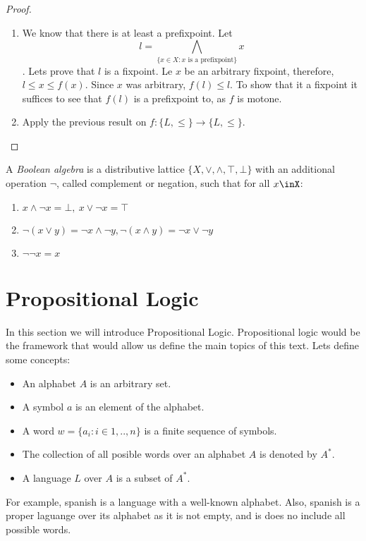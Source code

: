 \begin{definition}
\begin{proof}
  \begin{enumerate}
  \item We know that there is at least a prefixpoint. Let
    $$l = \bigwedge_{\{x\in X: x\text{ is a prefixpoint}\}} x $$. 
    Lets prove that $l$ is a fixpoint. Le $x$ be an arbitrary fixpoint, therefore, $l \le x \le f(x)$. Since $x$ was arbitrary, $f(l) \le l$. To show that it a fixpoint it suffices to see that $f(l)$ is a prefixpoint to, as $f$ is motone.
  \item Apply the previous result on $f:\{L,\le\}\to \{L,\le\}$.
  \end{enumerate}
\end{proof}
  
\begin{definition}
  A \emph{Boolean algebra} is a distributive lattice  $\{X, \vee, \wedge, \top,\bot\}$ with an additional operation $\neg$, called complement or negation, such that for all $x\inX$:
  \begin{enumerate}
  \item $ x\wedge \neg x = \bot,\ x\vee \neg x = \top $
  \item $ \neg(x \vee y) = \neg x \wedge \neg y,  \neg(x \wedge y) = \neg x \vee \neg y$
  \item $\neg \neg x = x$
  \end{enumerate}
\end{definition}
    


\section{Propositional Logic}
In this section we will introduce Propositional Logic. Propositional logic would be the framework that would allow us define the main topics of this text.  Lets define some concepts:
\begin{itemize}
\item An alphabet $A$ is an arbitrary set.
\item A symbol $a$ is an element of the alphabet.
\item A word $w = \{a_i:i\in 1,..,n\}$ is a finite sequence of symbols.
\item The collection of all posible words over an alphabet $A$ is denoted by $A^*$.
\item A language $L$ over $A$ is a subset of $A^*$.
\end{itemize}

For example, spanish is a language with a well-known alphabet. Also, spanish is a proper laguange over its alphabet as it is not empty, and is does no include all possible words.\\


\end{definition}
